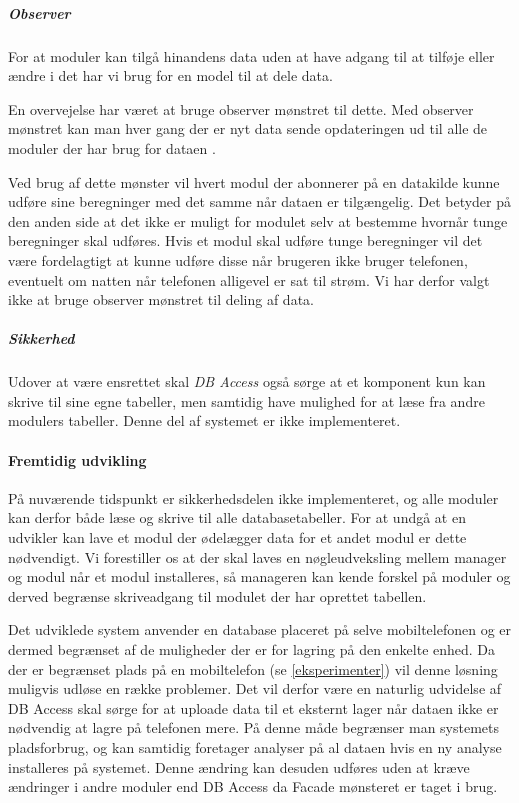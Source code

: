 \subparagraph{Observer}
For at moduler kan tilgå hinandens data uden at have adgang til at tilføje eller ændre i det har vi brug for en model til at dele data.

En overvejelse har været at bruge observer mønstret til dette.
Med observer mønstret kan man hver gang der er nyt data sende opdateringen ud til alle de moduler der har brug for dataen \citep[p.~244]{gamma1994design}.

Ved brug af dette mønster vil hvert modul der abonnerer på en datakilde kunne udføre sine beregninger med det samme når dataen er tilgængelig.
Det betyder på den anden side at det ikke er muligt for modulet selv at bestemme hvornår tunge beregninger skal udføres.
Hvis et modul skal udføre tunge beregninger vil det være fordelagtigt at kunne udføre disse når brugeren ikke bruger telefonen, eventuelt om natten når telefonen alligevel er sat til strøm.
Vi har derfor valgt ikke at bruge observer mønstret til deling af data.

\subparagraph{Sikkerhed}
Udover at være ensrettet skal \textit{DB Access} også sørge at et komponent kun kan skrive til sine egne tabeller, men samtidig have mulighed for at læse fra andre modulers tabeller.
Denne del af systemet er ikke implementeret.

\paragraph{Fremtidig udvikling}
På nuværende tidspunkt er sikkerhedsdelen ikke implementeret, og alle moduler kan derfor både læse og skrive til alle databasetabeller.
For at undgå at en udvikler kan lave et modul der ødelægger data for et andet modul er dette nødvendigt.
Vi forestiller os at der skal laves en nøgleudveksling mellem manager og modul når et modul installeres, så manageren kan kende forskel på moduler og derved begrænse skriveadgang til modulet der har oprettet tabellen.

Det udviklede system anvender en database placeret på selve mobiltelefonen og er dermed begrænset af de muligheder der er for lagring på den enkelte enhed.
Da der er begrænset plads på en mobiltelefon (se \cref{eksperimenter}) vil denne løsning muligvis udløse en række problemer.
Det vil derfor være en naturlig udvidelse af DB Access skal sørge for at uploade data til et eksternt lager når dataen ikke er nødvendig at lagre på telefonen mere.
På denne måde begrænser man systemets pladsforbrug, og kan samtidig foretager analyser på al dataen hvis en ny analyse installeres på systemet.
Denne ændring kan desuden udføres uden at kræve ændringer i andre moduler end DB Access da Facade mønsteret er taget i brug.

